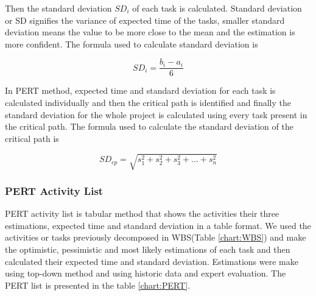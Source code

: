\begin{spacing}{1}
Then the standard deviation $SD_{i}$ of each task is calculated. Standard deviation or SD signifies the variance of expected time of the tasks, smaller standard deviation means the value to be more close to the mean and the estimation is more confident. The formula used to calculate standard deviation is \newline

\begin{equation}
SD_{i} = \frac{b_{i} - a_{i}}{6} 
\end{equation}

In PERT method, expected time and standard deviation for each task is calculated individually and then the critical path is identified and finally the standard deviation for the whole project is calculated using every task present in the critical path. The formula used to calculate the standard deviation of the critical path is \newline

\begin{equation}
SD_{cp} = \sqrt{s_{1}^2 + s_{2}^2 + s_{3}^2 + \dots + s_n^2} 
\end{equation}

\subsubsection{PERT Activity List}
PERT activity list is tabular method that shows the activities their three estimations, expected time and standard deviation in a table format. We used the activities or tasks previously decomposed in WBS(Table \ref{chart:WBS}) and make the optimistic, pessimistic and most likely estimations of each task and then calculated their expected time and standard deviation. Estimations were make using top-down method and using historic data and expert evaluation. The PERT list is presented in the table \ref{chart:PERT}. 


\end{spacing}

